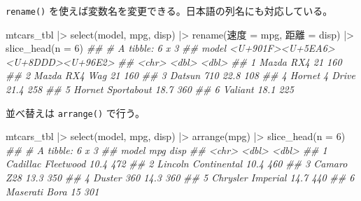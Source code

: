 \documentclass[
  letterpaper,
  xelatex,
  ja=standard, xelatex]{bxjsbook}
\newenvironment{Shaded}{\begin{snugshade}}{\end{snugshade}}
\newcommand{\AttributeTok}[1]{\textcolor[rgb]{0.40,0.45,0.13}{#1}}
\newcommand{\DecValTok}[1]{\textcolor[rgb]{0.68,0.00,0.00}{#1}}
\newcommand{\DocumentationTok}[1]{\textcolor[rgb]{0.37,0.37,0.37}{\textit{#1}}}
\newcommand{\FunctionTok}[1]{\textcolor[rgb]{0.28,0.35,0.67}{#1}}
\newcommand{\NormalTok}[1]{\textcolor[rgb]{0.00,0.23,0.31}{#1}}
\newcommand{\OtherTok}[1]{\textcolor[rgb]{0.00,0.23,0.31}{#1}}
\newcommand{\SpecialCharTok}[1]{\textcolor[rgb]{0.37,0.37,0.37}{#1}}
\newcommand{\StringTok}[1]{\textcolor[rgb]{0.13,0.47,0.30}{#1}}
\begin{document}
\texttt{rename()}
を使えば変数名を変更できる。日本語の列名にも対応している。

\begin{Shaded}
\begin{Highlighting}[]
\NormalTok{mtcars\_tbl }\SpecialCharTok{|\textgreater{}} 
  \FunctionTok{select}\NormalTok{(model, mpg, disp) }\SpecialCharTok{|\textgreater{}} 
  \FunctionTok{rename}\NormalTok{(}\StringTok{\textasciigrave{}}\AttributeTok{速度}\StringTok{\textasciigrave{}} \OtherTok{=}\NormalTok{ mpg, }\StringTok{\textasciigrave{}}\AttributeTok{距離}\StringTok{\textasciigrave{}} \OtherTok{=}\NormalTok{ disp) }\SpecialCharTok{|\textgreater{}} 
  \FunctionTok{slice\_head}\NormalTok{(}\AttributeTok{n =} \DecValTok{6}\NormalTok{)}
\DocumentationTok{\#\# \# A tibble: 6 x 3}
\DocumentationTok{\#\#   model             \textasciigrave{}\textless{}U+901F\textgreater{}\textless{}U+5EA6\textgreater{}\textasciigrave{} \textasciigrave{}\textless{}U+8DDD\textgreater{}\textless{}U+96E2\textgreater{}\textasciigrave{}}
\DocumentationTok{\#\#   \textless{}chr\textgreater{}              \textless{}dbl\textgreater{}  \textless{}dbl\textgreater{}}
\DocumentationTok{\#\# 1 Mazda RX4           21      160}
\DocumentationTok{\#\# 2 Mazda RX4 Wag       21      160}
\DocumentationTok{\#\# 3 Datsun 710          22.8    108}
\DocumentationTok{\#\# 4 Hornet 4 Drive      21.4    258}
\DocumentationTok{\#\# 5 Hornet Sportabout   18.7    360}
\DocumentationTok{\#\# 6 Valiant             18.1    225}
\end{Highlighting}
\end{Shaded}

並べ替えは \texttt{arrange()} で行う。

\begin{Shaded}
\begin{Highlighting}[]
\NormalTok{mtcars\_tbl }\SpecialCharTok{|\textgreater{}} 
  \FunctionTok{select}\NormalTok{(model, mpg, disp) }\SpecialCharTok{|\textgreater{}} 
  \FunctionTok{arrange}\NormalTok{(mpg) }\SpecialCharTok{|\textgreater{}} 
  \FunctionTok{slice\_head}\NormalTok{(}\AttributeTok{n =} \DecValTok{6}\NormalTok{)}
\DocumentationTok{\#\# \# A tibble: 6 x 3}
\DocumentationTok{\#\#   model                 mpg  disp}
\DocumentationTok{\#\#   \textless{}chr\textgreater{}               \textless{}dbl\textgreater{} \textless{}dbl\textgreater{}}
\DocumentationTok{\#\# 1 Cadillac Fleetwood   10.4   472}
\DocumentationTok{\#\# 2 Lincoln Continental  10.4   460}
\DocumentationTok{\#\# 3 Camaro Z28           13.3   350}
\DocumentationTok{\#\# 4 Duster 360           14.3   360}
\DocumentationTok{\#\# 5 Chrysler Imperial    14.7   440}
\DocumentationTok{\#\# 6 Maserati Bora        15     301}
\end{Highlighting}
\end{Shaded}
\end{document}
